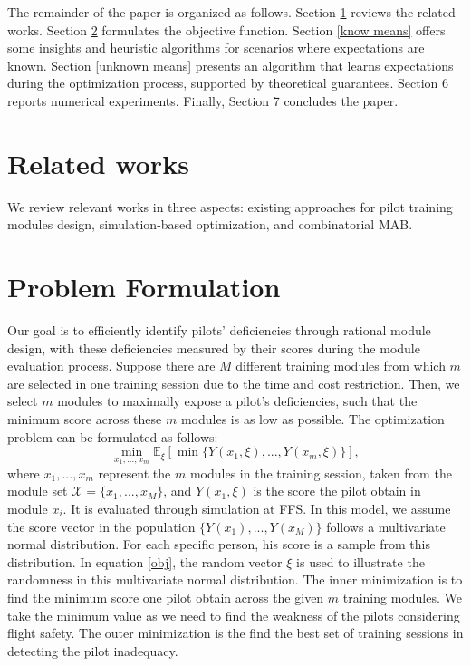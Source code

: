 \documentclass[opre,sglanonrev]{informs4}
\begin{document}
The remainder of the paper is organized as follows. Section \ref{related works} reviews the related works. Section \ref{problem formulation} formulates the objective function. Section \ref{know means} offers some insights and heuristic algorithms for scenarios where expectations are known. Section \ref{unknown means} presents an algorithm that learns expectations during the optimization process, supported by theoretical guarantees. Section 6 reports numerical experiments. Finally, Section 7 concludes the paper.

\section{Related works}
\label{related works}
We review relevant works in three aspects: existing approaches for pilot training modules design, simulation-based optimization, and combinatorial MAB.

\section{Problem Formulation}
\label{problem formulation}
Our goal is to efficiently identify pilots’ deficiencies through rational module design, with these deficiencies measured by their scores during the module evaluation process. Suppose there are $M$ different training modules from which $m$ are selected in one training session due to the time and cost restriction. Then, we select $m$ modules to maximally expose a pilot’s deficiencies, such that the minimum score across these $m$ modules is as low as possible. The optimization problem can be formulated as follows:
\begin{equation}
	\min_{x_1,...,x_m} \mathbb{E}_\xi[\min\{Y(x_1,\xi),...,Y(x_m,\xi) \} ], 
	\label{obj}
\end{equation}
where $x_1,...,x_m$ represent the $m$ modules in the training session, taken from the module set $\mathcal{X} = \{x_1,...,x_M\}$, and $Y(x_1,\xi)$ is the score the pilot obtain in module $x_i$. It is evaluated through simulation at FFS. In this model, we assume the score vector in the population $\{Y(x_1),...,Y(x_M)\}$ follows a multivariate normal distribution. For each specific person, his score is a sample from this distribution. In equation \eqref{obj}, the random vector $\xi$ is used to illustrate the randomness in this multivariate normal distribution. The inner minimization is to find the minimum score one pilot obtain across the given $m$ training modules. We take the minimum value as we need to find the weakness of the pilots considering flight safety. The outer minimization is the find the best set of training sessions in detecting the pilot inadequacy.
\end{document}
